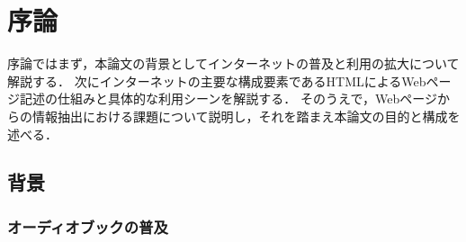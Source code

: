 \chapter{序論}

序論ではまず，本論文の背景としてインターネットの普及と利用の拡大について解説する．
次にインターネットの主要な構成要素であるHTMLによるWebページ記述の仕組みと具体的な利用シーンを解説する．
そのうえで，Webページからの情報抽出における課題について説明し，それを踏まえ本論文の目的と構成を述べる．

\section{背景}

\subsection{オーディオブックの普及}

